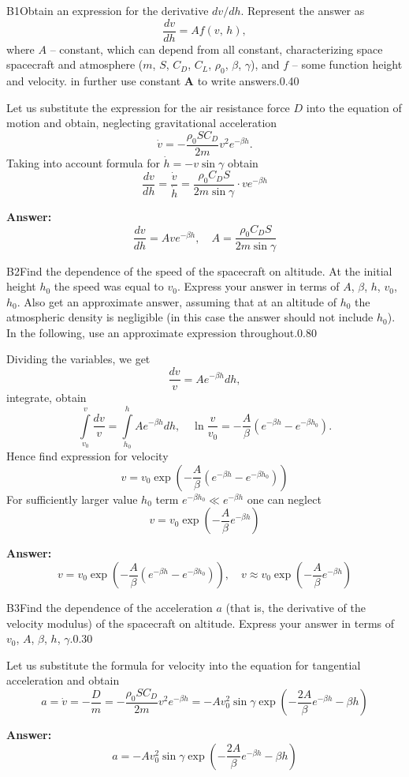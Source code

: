 \documentclass[11pt,a4paper]{article}
\begin{document}
\begin{solcard}{B1}{Obtain an expression for the derivative $dv/dh$. Represent the answer as $$ \frac{dv}{dh} = A f(v,\,h), $$ where $A$ – constant, which can depend from all constant, characterizing space spacecraft and atmosphere ($m$, $S$, $C_D$, $C_L$, $\rho_0$, $\beta$, $\gamma$), and $f$ – some function height and velocity. in further use constant $\mathbf{A}$ to write answers.}{0.40}

Let us substitute the expression for the air resistance force $D$ into the equation of motion and obtain, neglecting gravitational acceleration $$\dot v = - \dfrac{\rho_0 SC_D}{2m}v^2e^{-\beta h}.$$Taking into account formula for $\dot{h} = - v\sin \gamma$ obtain $$\dfrac{dv}{dh}=\dfrac{\dot v}{\dot h}=\dfrac{\rho_0 C_D S}{2m\sin{\gamma}}\cdot ve^{-\beta h}$$

\par\smallskip\noindent\textbf{Answer:} $$\dfrac{dv}{dh}=A ve^{-\beta h}, \quad A = \dfrac{\rho_0 C_D S}{2m\sin{\gamma}}$$
\end{solcard}

\begin{solcard}{B2}{Find the dependence of the speed of the spacecraft on altitude. At the initial height $h_0$ the speed was equal to $v_0$. Express your answer in terms of $A$, $\beta$, $h$, $v_0$, $h_0$. Also get an approximate answer, assuming that at an altitude of $h_0$ the atmospheric density is negligible (in this case the answer should not include $h_0$). In the following, use an approximate expression throughout.}{0.80}

Dividing the variables, we get $$ \frac{dv}{v} = A e^{- \beta h} dh, $$integrate, obtain $$\int\limits_{v_0}^{v}\dfrac{dv}{v}=\int\limits_{h_0}^{h}Ae^{-\beta h}dh, \quad \ln\dfrac{v}{v_0}=-\dfrac{A}{\beta}(e^{-\beta h}-e^{-\beta h_0}).$$Hence find expression for velocity $$v=v_0\exp\left(-\dfrac{A}{\beta}(e^{-\beta h}-e^{-\beta h_0})\right)$$For sufficiently larger value $h_0$ term $e^{- \beta h_0} \ll e^{- \beta h}$ one can neglect $$v=v_0\exp\left(-\dfrac{A}{\beta}e^{-\beta h}\right)$$

\par\smallskip\noindent\textbf{Answer:} $$v=v_0\exp\left(-\dfrac{A}{\beta}(e^{-\beta h}-e^{-\beta h_0})\right), \quad v\approx v_0\exp\left(-\dfrac{A}{\beta}e^{-\beta h}\right)$$
\end{solcard}

\begin{solcard}{B3}{Find the dependence of the acceleration $a$ (that is, the derivative of the velocity modulus) of the spacecraft on altitude. Express your answer in terms of $v_0$, $A$, $\beta$, $h$, $\gamma$.}{0.30}

Let us substitute the formula for velocity into the equation for tangential acceleration and obtain $$a=\dot v=-\frac{D}{m}=- \dfrac{\rho_0 SC_D}{2m}v^2e^{-\beta h}=-Av_0^2\sin{\gamma}\exp\left(-\dfrac{2A}{\beta}e^{-\beta h}-\beta h\right)$$

\par\smallskip\noindent\textbf{Answer:} $$a=-Av_0^2\sin{\gamma}\exp\left(-\dfrac{2A}{\beta}e^{-\beta h}-\beta h\right)$$
\end{solcard}
\end{document}
